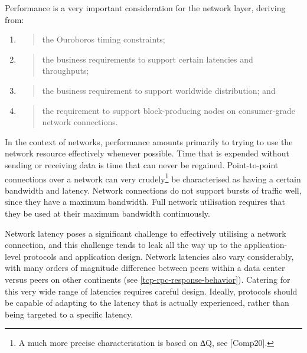 \documentclass[11pt,a4paper]{article}
\begin{document}
Performance is a very important consideration for the network layer,
deriving from:

\begin{enumerate}
\def\labelenumi{\arabic{enumi}.}
\item
  \begin{quote}
  the Ouroboros timing constraints;
  \end{quote}
\item
  \begin{quote}
  the business requirements to support certain latencies and
  throughputs;
  \end{quote}
\item
  \begin{quote}
  the business requirement to support worldwide distribution; and
  \end{quote}
\item
  \begin{quote}
  the requirement to support block-producing nodes on consumer-grade
  network connections.
  \end{quote}
\end{enumerate}

In the context of networks, performance amounts primarily to trying to
use the network resource effectively whenever possible. Time that is
expended without sending or receiving data is time that can never be
regained. Point-to-point connections over a network can very
crudely\footnote{A much more precise characterisation is based on ∆Q,
  see {[}Comp20{]}.} be characterised as having a certain bandwidth and
latency. Network connections do not support bursts of traffic well,
since they have a maximum bandwidth. Full network utilisation requires
that they be used at their maximum bandwidth continuously.

Network latency poses a significant challenge to effectively utilising a
network connection, and this challenge tends to leak all the way up to
the application-level protocols and application design. Network
latencies also vary considerably, with many orders of magnitude
difference between peers within a data center versus peers on other
continents (see \cref{tcp-rpc-response-behavior}). Catering for this very wide range of latencies requires
careful design. Ideally, protocols should be capable of adapting to the
latency that is actually experienced, rather than being targeted to a
specific latency.
\end{document}
